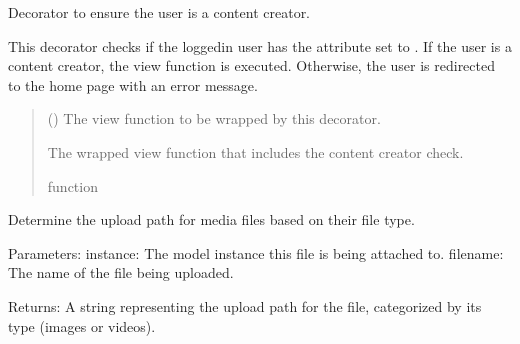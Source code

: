 \documentclass[letterpaper,10pt,english]{sphinxmanual}
\begin{document}
\begin{fulllineitems}
\label{\detokenize{modules/others:creator.decorators.creator_required}}
\pysigstartsignatures
{}
\pysigstopsignatures
\sphinxAtStartPar
Decorator to ensure the user is a content creator.

\sphinxAtStartPar
This decorator checks if the logged\sphinxhyphen{}in user has the  attribute set to .
If the user is a content creator, the view function is executed. Otherwise, the user is redirected to the home page
with an error message.
\begin{quote}\begin{description}
\sphinxAtStartPar
{} () \textendash{} The view function to be wrapped by this decorator.

\sphinxAtStartPar
The wrapped view function that includes the content creator check.

\sphinxAtStartPar
function

\end{description}\end{quote}

\end{fulllineitems}

\label{\detokenize{modules/others:module-creator.helpers}}

\begin{fulllineitems}
\label{\detokenize{modules/others:creator.helpers.get_upload_to}}
\pysigstartsignatures
{}
\pysigstopsignatures
\sphinxAtStartPar
Determine the upload path for media files based on their file type.

\sphinxAtStartPar
Parameters:
\sphinxhyphen{} instance: The model instance this file is being attached to.
\sphinxhyphen{} filename: The name of the file being uploaded.

\sphinxAtStartPar
Returns:
\sphinxhyphen{} A string representing the upload path for the file, categorized by its type (images or videos).

\end{fulllineitems}
\end{document}
